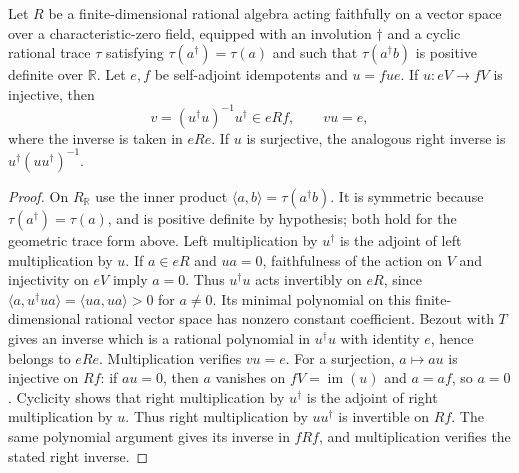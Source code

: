 \begin{proposition}
Let $R$ be a finite-dimensional rational algebra acting faithfully on
a vector space over a characteristic-zero field, equipped with an
involution $\dagger$ and a cyclic rational trace $\tau$ satisfying
$\tau(a^\dagger)=\tau(a)$ and such that
$\tau(a^\dagger b)$ is positive definite over $\mathbb R$.
Let $e,f$ be self-adjoint idempotents
and $u=fue$.  If $u:eV\to fV$ is injective, then
\[
 v=(u^\dagger u)^{-1}u^\dagger\in eRf,
 \qquad vu=e,
\]
where the inverse is taken in $eRe$.  If $u$ is surjective, the analogous
right inverse is $u^\dagger(uu^\dagger)^{-1}$.
\end{proposition}
\begin{proof}
On $R_{\mathbb R}$ use the inner product
$\langle a,b\rangle=\tau(a^\dagger b)$.
It is symmetric because $\tau(a^\dagger)=\tau(a)$, and is positive
definite by hypothesis; both hold for the geometric trace form above.
Left multiplication by $u^\dagger$ is the adjoint of left multiplication
by $u$.  If $a\in eR$ and $ua=0$, faithfulness of the action on $V$ and
injectivity on $eV$ imply $a=0$.  Thus $u^\dagger u$ acts invertibly on
$eR$, since
$\langle a,u^\dagger ua\rangle=\langle ua,ua\rangle>0$ for $a\ne0$.
Its minimal polynomial on this finite-dimensional rational vector space
has nonzero constant coefficient.  Bezout with $T$ gives an inverse which
is a rational polynomial in $u^\dagger u$ with identity $e$, hence belongs
to $eRe$.  Multiplication verifies $vu=e$.  For a surjection,
$a\mapsto au$ is injective on $Rf$: if $au=0$, then $a$ vanishes on
$fV=\operatorname{im}(u)$ and $a=af$, so $a=0$.
Cyclicity shows that right multiplication by $u^\dagger$ is the adjoint
of right multiplication by $u$.  Thus right multiplication by
$uu^\dagger$ is invertible on $Rf$.  The same polynomial argument gives
its inverse in $fRf$, and multiplication verifies the stated right inverse.
\end{proof}

